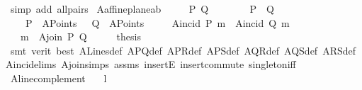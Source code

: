 \begin{isabellebody}
\ {\isacharparenleft}{\kern0pt}simp\ add{\isacharcolon}{\kern0pt}\ all{\isacharunderscore}{\kern0pt}pairs{\isacharparenright}{\kern0pt}\isanewline
{}\isamarkupfalse%
%
\endisatagproof
{\isafoldproof}%
%
\isadelimproof
\isanewline
%
\endisadelimproof
\isanewline
{}\isamarkupfalse%
\ A{}affine{\isacharunderscore}{\kern0pt}plane{\isacharunderscore}{\kern0pt}a{}b{\isacharcolon}{\kern0pt}\ \ \isanewline
\ \ \ P\ Q\isanewline
\ \ \ \isanewline
\ \ \ \ {\isachardoublequoteopen}P\ {\isasymnoteq}\ Q{\isachardoublequoteclose}\ \ \isanewline
\ \ \ \ {\isachardoublequoteopen}P\ {\isasymin}\ A{}Points{\isachardoublequoteclose}\ \ \ {\isachardoublequoteopen}Q\ {\isasymin}\ A{}Points{\isachardoublequoteclose}\ \isanewline
\ \ \ \ {\isachardoublequoteopen}A{}incid\ P\ m{\isachardoublequoteclose}\ \ {\isachardoublequoteopen}A{}incid\ Q\ m{\isachardoublequoteclose}\isanewline
\ \ \ {\isachardoublequoteopen}m\ {\isacharequal}{\kern0pt}\ A{}join\ P\ Q{\isachardoublequoteclose}\isanewline
%
\isadelimproof
%
\endisadelimproof
%
\isatagproof
{}\isamarkupfalse%
\ {\isacharminus}{\kern0pt}\isanewline
\ \ \isamarkupfalse%
\ {\isacharquery}{\kern0pt}thesis\ \isamarkupfalse%
\ {\isacharparenleft}{\kern0pt}smt\ {\isacharparenleft}{\kern0pt}verit{\isacharcomma}{\kern0pt}\ best{\isacharparenright}{\kern0pt}\ A{}Lines{\isacharunderscore}{\kern0pt}def\ A{}PQ{\isacharunderscore}{\kern0pt}def\ A{}PR{\isacharunderscore}{\kern0pt}def\ A{}PS{\isacharunderscore}{\kern0pt}def\ A{}QR{\isacharunderscore}{\kern0pt}def\ A{}QS{\isacharunderscore}{\kern0pt}def\ A{}RS{\isacharunderscore}{\kern0pt}def\ A{}incid{\isachardot}{\kern0pt}elims{\isacharparenleft}{\kern0pt}{}{\isacharparenright}{\kern0pt}\ A{}join{\isachardot}{\kern0pt}simps\ assms\ insertE\ insert{\isacharunderscore}{\kern0pt}commute\ singleton{\isacharunderscore}{\kern0pt}iff{\isacharparenright}{\kern0pt}\isanewline
{}\isamarkupfalse%
%
\endisatagproof
{\isafoldproof}%
%
\isadelimproof
%
\endisadelimproof
\ \isanewline
\isanewline
{}\isamarkupfalse%
\ A{}line{\isacharunderscore}{\kern0pt}complement{\isacharcolon}{\kern0pt}\isanewline
\ \ \ l\isanewline

\end{isabellebody}
